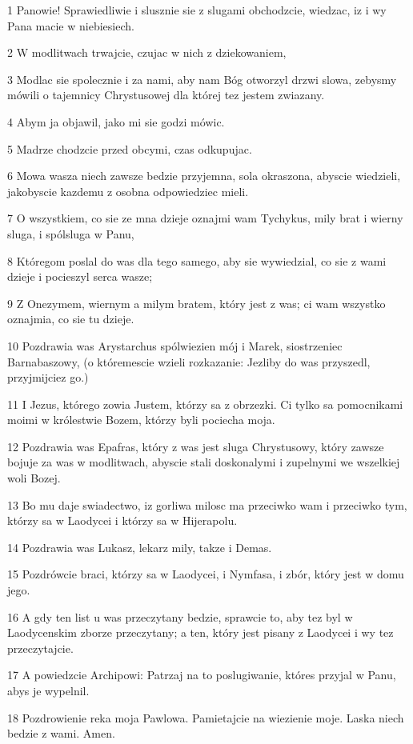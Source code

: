 \par 1 Panowie! Sprawiedliwie i slusznie sie z slugami obchodzcie, wiedzac, iz i wy Pana macie w niebiesiech.
\par 2 W modlitwach trwajcie, czujac w nich z dziekowaniem,
\par 3 Modlac sie spolecznie i za nami, aby nam Bóg otworzyl drzwi slowa, zebysmy mówili o tajemnicy Chrystusowej dla której tez jestem zwiazany.
\par 4 Abym ja objawil, jako mi sie godzi mówic.
\par 5 Madrze chodzcie przed obcymi, czas odkupujac.
\par 6 Mowa wasza niech zawsze bedzie przyjemna, sola okraszona, abyscie wiedzieli, jakobyscie kazdemu z osobna odpowiedziec mieli.
\par 7 O wszystkiem, co sie ze mna dzieje oznajmi wam Tychykus, mily brat i wierny sluga, i spólsluga w Panu,
\par 8 Któregom poslal do was dla tego samego, aby sie wywiedzial, co sie z wami dzieje i pocieszyl serca wasze;
\par 9 Z Onezymem, wiernym a milym bratem, który jest z was; ci wam wszystko oznajmia, co sie tu dzieje.
\par 10 Pozdrawia was Arystarchus spólwiezien mój i Marek, siostrzeniec Barnabaszowy, (o któremescie wzieli rozkazanie: Jezliby do was przyszedl, przyjmijciez go.)
\par 11 I Jezus, którego zowia Justem, którzy sa z obrzezki. Ci tylko sa pomocnikami moimi w królestwie Bozem, którzy byli pociecha moja.
\par 12 Pozdrawia was Epafras, który z was jest sluga Chrystusowy, który zawsze bojuje za was w modlitwach, abyscie stali doskonalymi i zupelnymi we wszelkiej woli Bozej.
\par 13 Bo mu daje swiadectwo, iz gorliwa milosc ma przeciwko wam i przeciwko tym, którzy sa w Laodycei i którzy sa w Hijerapolu.
\par 14 Pozdrawia was Lukasz, lekarz mily, takze i Demas.
\par 15 Pozdrówcie braci, którzy sa w Laodycei, i Nymfasa, i zbór, który jest w domu jego.
\par 16 A gdy ten list u was przeczytany bedzie, sprawcie to, aby tez byl w Laodycenskim zborze przeczytany; a ten, który jest pisany z Laodycei i wy tez przeczytajcie.
\par 17 A powiedzcie Archipowi: Patrzaj na to poslugiwanie, któres przyjal w Panu, abys je wypelnil.
\par 18 Pozdrowienie reka moja Pawlowa. Pamietajcie na wiezienie moje. Laska niech bedzie z wami. Amen.



